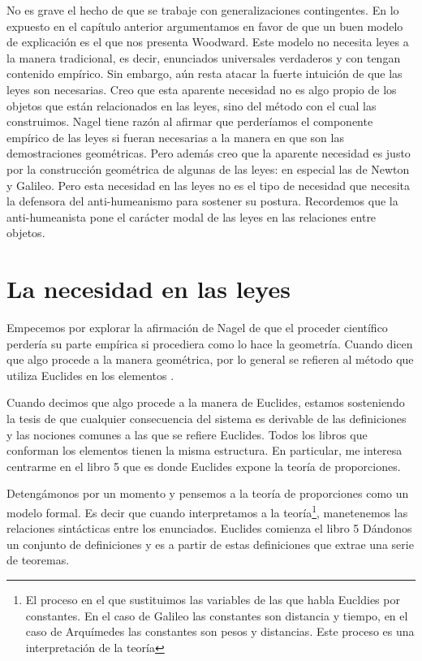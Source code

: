 No es grave el hecho de que se trabaje con generalizaciones contingentes. En lo expuesto en el capítulo anterior argumentamos en favor de que un buen modelo de explicación es el que nos presenta Woodward. Este modelo no necesita leyes a la manera tradicional, es decir, enunciados universales verdaderos y con tengan contenido empírico. Sin embargo, aún resta atacar la fuerte intuición de que las leyes son necesarias. Creo que esta aparente necesidad no es algo propio de los objetos que están relacionados en las leyes, sino del método con el cual las construimos. Nagel tiene razón al afirmar que perderíamos el componente empírico de las leyes si fueran necesarias a la manera en que son las demostraciones geométricas. Pero además creo que la aparente necesidad es justo por la construcción geométrica de algunas de las leyes: en especial las de Newton y Galileo. Pero esta necesidad en las leyes no es el tipo de necesidad que necesita la defensora del anti-humeanismo para sostener su postura. Recordemos que la anti-humeanista pone el carácter modal de las leyes en las relaciones entre objetos.

\section{La necesidad en las leyes}

\noindent Empecemos por explorar la afirmación de Nagel de que el proceder científico perdería su parte empírica si procediera como lo hace la geometría. Cuando dicen que algo procede a la manera geométrica, por lo general se refieren al método que utiliza Euclides en los elementos \cite{Euclid2008}.

Cuando decimos que algo procede a la manera de Euclides, estamos sosteniendo la tesis de que cualquier consecuencia del sistema es derivable de las definiciones y las nociones comunes a las que se refiere Euclides. Todos los libros que conforman los elementos tienen la misma estructura. En particular, me interesa centrarme en el libro 5 que es donde Euclides expone la teoría de proporciones.

Detengámonos por un momento y pensemos a la teoría de proporciones como un modelo formal. Es decir que cuando interpretamos a la teoría\footnote{El proceso en el que sustituimos las variables de las que habla Eucldies por constantes. En el caso de Galileo las constantes son distancia y tiempo, en el caso de Arquímedes las constantes son pesos y distancias. Este proceso es una interpretación de la teoría}, manetenemos las relaciones sintácticas entre los enunciados. Euclides comienza el libro 5 Dándonos un conjunto de definiciones y es a partir de estas definiciones que extrae una serie de teoremas.

